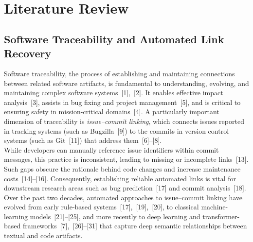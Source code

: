\section{Literature Review}

\subsection{Software Traceability and Automated Link Recovery}
Software traceability, the process of establishing and maintaining connections between related software artifacts, is fundamental to understanding, evolving, and maintaining complex software systems~[1],~[2]. It enables effective impact analysis~[3], assists in bug fixing and project management~[5], and is critical to ensuring safety in mission-critical domains~[4].  
A particularly important dimension of traceability is \emph{issue–commit linking}, which connects issues reported in tracking systems (such as Bugzilla~[9]) to the commits in version control systems (such as Git~[11]) that address them~[6]–[8].\\

While developers can manually reference issue identifiers within commit messages, this practice is inconsistent, leading to missing or incomplete links~[13]. Such gaps obscure the rationale behind code changes and increase maintenance costs~[14]–[16]. Consequently, establishing reliable automated links is vital for downstream research areas such as bug prediction~[17] and commit analysis~[18].  
Over the past two decades, automated approaches to issue–commit linking have evolved from early rule-based systems~[17],~[19],~[20], to classical machine-learning models~[21]–[25], and more recently to deep learning and transformer-based frameworks~[7],~[26]–[31] that capture deep semantic relationships between textual and code artifacts.

